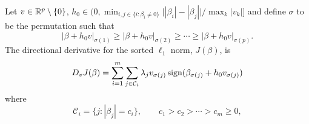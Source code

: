 \begin{theorem}
  \label{thm:sl1-directional-derivative}
  Let $v \in \mathbb{R}^p \setminus \{0\}$, \(h_0 \in \big(0, \min_{i,j \in
    \{i : \beta_i \neq 0\}}\big| |\beta_i| - |\beta_j| \big|/\max_k|v_k| \big]\) and
  define \(\sigma\) to be the permutation such that
  \[
    |\beta + h_0v|_{\sigma(1)} \geq |\beta + h_0v |_{\sigma(2)}
    \geq \cdots \geq |\beta + h_0v|_{\sigma(p)}.
  \]
  The directional derivative for the sorted \(\ell_1\) norm, \(J(\beta)\), is
  \[
    D_v J(\beta) =
    \sum_{i=1}^m \sum_{j \in \mathcal{C}_i} \lambda_j v_{\sigma(j)}\operatorname{sign}(\beta_{\sigma(j)} + h_0v_{\sigma(j)})\]
  where
  \[
    \mathcal{C}_i = \{j : |\beta_j| = c_i\},\qquad
    c_1 > c_2 > \cdots > c_m \geq 0,
  \]
\end{theorem}
